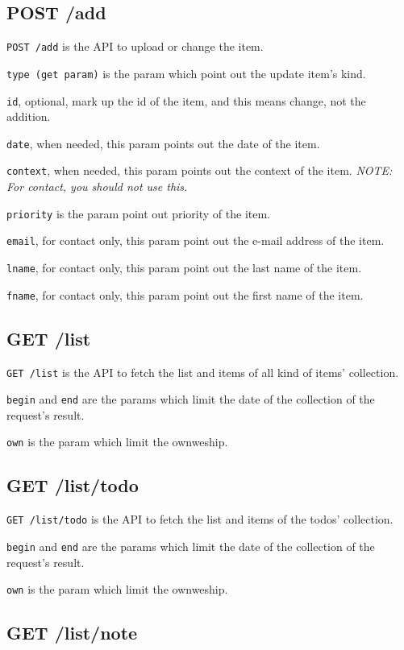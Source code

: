 \documentclass{article}
\begin{document}
  \subsection{POST /add}

  \verb|POST /add| is the API to upload or change the item.

  \verb|type (get param)| is the param which point out the update item's kind.

  \verb|id|, optional, mark up the id of the item, and this means change, not the addition.

  \verb|date|, when needed, this param points out the date of the item.

  \verb|context|, when needed, this param points out the context of the item. \textit{NOTE: For contact, you should not use this.}

  \verb|priority| is the param point out priority of the item.

  \verb|email|, for contact only, this param point out the e-mail address of the item.

  \verb|lname|, for contact only, this param point out the last name of the item.

  \verb|fname|, for contact only, this param point out the first name of the item.

  \subsection{GET /list}
  
  \verb|GET /list| is the API to fetch the list and items of all kind of items' collection.
  
  \verb|begin| and \verb|end| are the params which limit the date of the collection of the request's result.
  
  \verb|own| is the param which limit the ownweship.

  \subsection{GET /list/todo}

  \verb|GET /list/todo| is the API to fetch the list and items of the todos' collection.

  \verb|begin| and \verb|end| are the params which limit the date of the collection of the request's result.

  \verb|own| is the param which limit the ownweship.


  \subsection{GET /list/note}
\end{document}
